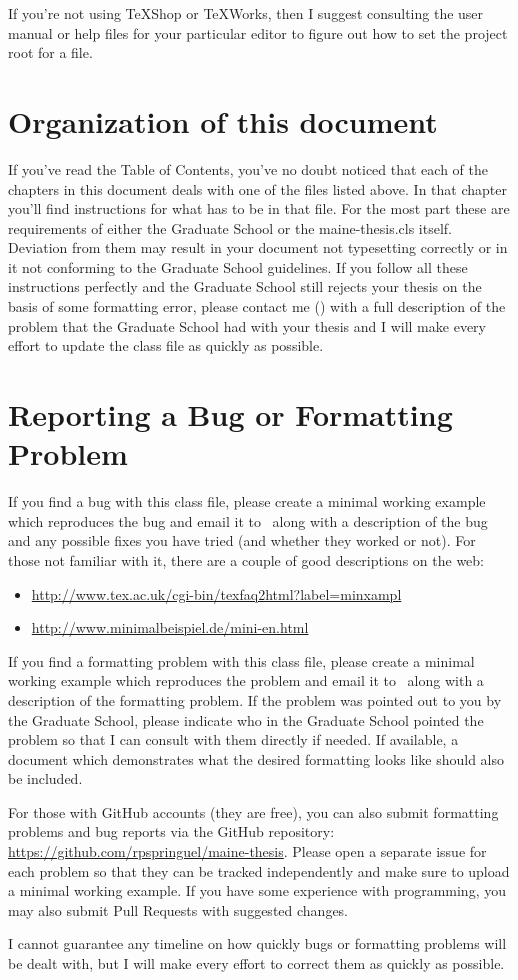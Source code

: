 If you're not using TeXShop or TeXWorks, then I suggest consulting the user manual or help files for your particular editor to figure out how to set the project root for a file.

\section{Organization of this document}
If you've read the Table of Contents, you've no doubt noticed that each of the chapters in this document deals with one of the files listed above.  In that chapter you'll find instructions for what has to be in that file.  For the most part these are requirements of either the Graduate School or the maine-thesis.cls itself.  Deviation from them may result in your document not typesetting correctly or in it not conforming to the Graduate School guidelines.  If you follow all these instructions perfectly and the Graduate School still rejects your thesis on the basis of some formatting error, please contact me (\email) with a full description of the problem that the Graduate School had with your thesis and I will make every effort to update the class file as quickly as possible.

\section{Reporting a Bug or Formatting Problem}
If you find a bug with this class file, please create a minimal working example which reproduces the bug and email it to \email\ along with a description of the bug and any possible fixes you have tried (and whether they worked or not).  For those not familiar with it, there are a couple of good descriptions on the web:
\begin{itemize}
\item{\url{http://www.tex.ac.uk/cgi-bin/texfaq2html?label=minxampl}}
\item{\url{http://www.minimalbeispiel.de/mini-en.html}}
\end{itemize}

If you find a formatting problem with this class file, please create a minimal working example which reproduces the problem and email it to \email\ along with a description of the formatting problem.  If the problem was pointed out to you by the Graduate School, please indicate who in the Graduate School pointed the problem so that I can consult with them directly if needed.  If available, a document which demonstrates what the desired formatting looks like should also be included.

For those with GitHub accounts (they are free), you can also submit formatting problems and bug reports via the GitHub repository: \url{https://github.com/rpspringuel/maine-thesis}.  Please open a separate issue for each problem so that they can be tracked independently and make sure to upload a minimal working example.  If you have some experience with programming, you may also submit Pull Requests with suggested changes.

I cannot guarantee any timeline on how quickly bugs or formatting problems will be dealt with, but I will make every effort to correct them as quickly as possible.


\endinput